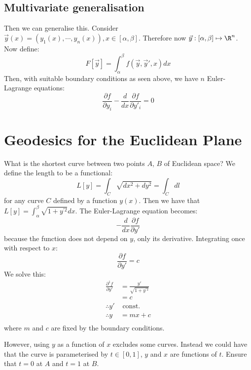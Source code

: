 \documentclass[../Main.tex]{subfiles}
\begin{document}
\subsection{Multivariate generalisation}
Then we can generalise this. Consider $\vec{y}(x) = (y_1(x), \cdots, y_n(x)), x \in [\alpha, \beta]$. Therefore now $\vec{y} : [\alpha, \beta] \mapsto \R^n$. Now define:
\begin{equation*}
    F[\vec{y}] = \int_\alpha^\beta f(\vec{y}, \vec{y}', x) dx
\end{equation*}
Then, with suitable boundary conditions as seen above, we have $n$ Euler-Lagrange equations:
\begin{equation}
    \frac{\partial f}{\partial y_i} - \frac{d}{dx} \frac{\partial f}{\partial y'_i} = 0
    \label{eqnMultivariateEulerLagrange}
\end{equation}
\section{Geodesics for the Euclidean Plane}
What is the shortest curve between two points $A$, $B$ of Euclidean space? We define the length to be a functional:
\begin{equation*}
    L[y] = \int_C \sqrt{dx^2 + dy^2} = \int_C dl
\end{equation*}
for any curve $C$ defined by a function $y(x)$.
Then we have that $L[y] = \int_\alpha^\beta \sqrt{1 + y^{\prime 2}}dx$. The Euler-Lagrange equation becomes:
\begin{equation*}
    -\frac{d}{dx} \frac{\partial f}{\partial y'}
\end{equation*}
because the function does not depend on $y$, only its derivative. Integrating once with respect to $x$:
\begin{equation*}
    \frac{\partial f}{\partial y'} = c
\end{equation*}
We solve this:
\begin{align*}
    \frac{\partial^{1}f}{\partial y'} &= \frac{y'}{\sqrt{1 + y^{\prime 2}}} \\
    &= c \\
    \therefore y' &\text{ const.} \\
    \therefore y &= mx + c \\
\end{align*}
where $m$ and $c$ are fixed by the boundary conditions.

However, using $y$ as a function of $x$ excludes some curves. Instead we could have that the curve is parameterised by $t \in [0, 1]$, $y$ and $x$ are functions of $t$. Ensure that $t = 0$ at $A$ and $t = 1$ at $B$.
\end{document}
